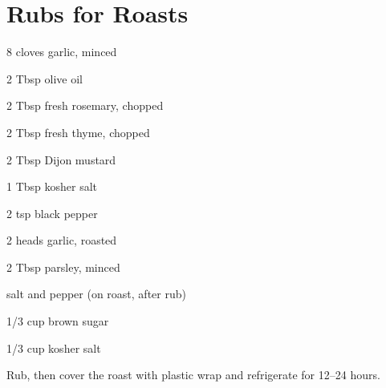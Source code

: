 \documentclass[oneside]{book}  %
\def\thisrecipe{}  %
\newcommand{\recipe}[1]{\section{#1}\def\thisrecipe{: #1}} %
\newcommand{\itemNL}{\item[] \hspace{-\labelsep}}  %
\begin{document}
\begin{twocols}
\end{twocols}
\recipe{Rubs for Roasts} \label{recipe:rubs_for_roasts} %

\begin{twocols}
  \begin{ingredients}
    \item[8] cloves garlic, minced
    \item[2 Tbsp] olive oil
    \item[2 Tbsp] fresh rosemary, chopped
    \item[2 Tbsp] fresh thyme, chopped
    \item[2 Tbsp] Dijon mustard
    \item[1 Tbsp] kosher salt
    \item[2 tsp]  black pepper
  \end{ingredients}

  \columnbreak

  \begin{ingredients}
    \item[2 heads] garlic, roasted
    \item[2 Tbsp] parsley, minced
    \itemNL salt and pepper (on roast, after rub)
  \end{ingredients}

  \begin{ingredients}
    \item[1/3 cup] brown sugar
    \item[1/3 cup] kosher salt
  \end{ingredients}
  \vspace{-0.75em} Rub, then cover the roast with plastic wrap and refrigerate
  for 12--24 hours.

\end{twocols}

\backmatter
\def\thisrecipe{}  %
 \printindex
\end{document}
